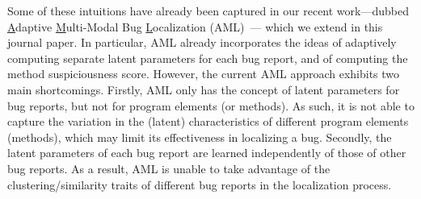 Some of these intuitions have already been captured in our recent work---dubbed \underline{A}daptive \underline{M}ulti-Modal Bug \underline{L}ocalization (AML)~\cite{Le:2015:IRS:2786805.2786880}--- which we extend in this journal paper. In particular, AML already incorporates the ideas of adaptively computing separate latent parameters for each bug report, and of computing the method suspiciousness score.
However, the current AML approach exhibits two main shortcomings. Firstly, AML only has the concept of latent parameters for bug reports, but not for program elements (or methods). As such, it is not able to capture the variation in the (latent) characteristics of different program elements (methods), which may limit its effectiveness in localizing a bug. Secondly, the latent parameters of each bug report are learned independently of those of other bug reports. As a result, AML is unable to take advantage of the clustering/similarity traits of different bug reports in the localization process.

